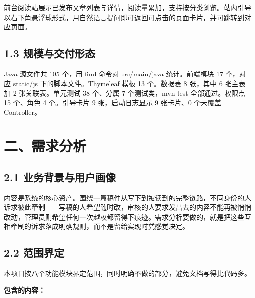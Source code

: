 \documentclass[zihao=-4,UTF8,openany]{ctexart}
\renewcommand{\_}{\textunderscore\allowbreak}
\begin{document}
前台阅读站展示已发布文章列表与详情，阅读量累加，支持按分类浏览。站内引导以右下角悬浮球形式，用自然语言提问即可返回可点击的页面卡片，并可跳转到对应页面。

\subsection*{\texorpdfstring{\textbf{1.3 规模与交付形态}}{1.3 规模与交付形态}}\label{ux89c4ux6a21ux4e0eux4ea4ux4ed8ux5f62ux6001}

Java 源文件共 105 个，用 find 命令对 src/main/java 统计。前端模块 17 个，对应 static/js 下的脚本文件。Thymeleaf 模板 13 个。数据表 8 张，其中 6 张主表加 2 张关联表。单元测试 38 个、分属 7 个测试类，mvn test 全部通过。权限点 15 个、角色 4 个。引导卡片 9 张，启动日志显示 9 张卡片、0 个未覆盖 Controller。

\section*{\texorpdfstring{\textbf{二、需求分析}}{二、需求分析}}\label{ux4e8cux9700ux6c42ux5206ux6790}

\subsection*{\texorpdfstring{\textbf{2.1 业务背景与用户画像}}{2.1 业务背景与用户画像}}\label{ux4e1aux52a1ux80ccux666fux4e0eux7528ux6237ux753bux50cf}

内容是系统的核心资产。围绕一篇稿件从写下到被读到的完整链路，不同身份的人诉求彼此牵制——写稿的人希望随时改，审核的人要求发出去的内容不能再被悄悄改动，管理员则希望任何一次越权都留得下痕迹。需求分析要做的，就是把这些互相牵制的诉求落成明确规则，而不是留给实现时凭感觉决定。

\subsection*{\texorpdfstring{\textbf{2.2 范围界定}}{2.2 范围界定}}\label{ux8303ux56f4ux754cux5b9a}

本项目按八个功能模块界定范围，同时明确不做的部分，避免文档写得比代码多。

\textbf{包含的内容：}
\end{document}
